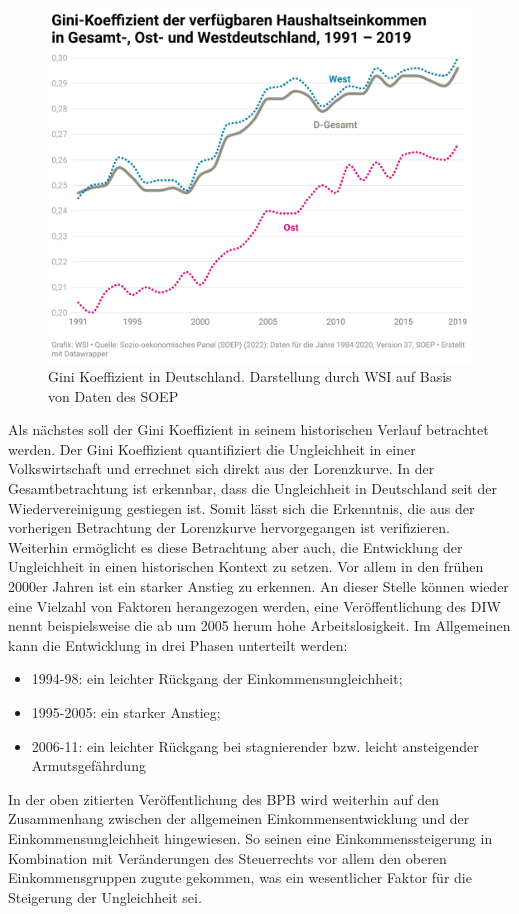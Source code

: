\documentclass[a4paper,12pt]{article}
\begin{document}
\begin{figure}[h]
\centering
\includegraphics*[width=1.0\textwidth]{gini}
\caption[short]{Gini Koeffizient in Deutschland. Darstellung durch WSI auf Basis von Daten des SOEP \cite{wsi_2024}}
\end{figure}

Als nächstes soll der Gini Koeffizient in seinem historischen Verlauf betrachtet werden. Der Gini Koeffizient quantifiziert die Ungleichheit in einer Volkswirtschaft und errechnet sich direkt aus der Lorenzkurve. In der Gesamtbetrachtung
ist erkennbar, dass die Ungleichheit in Deutschland seit der Wiedervereinigung gestiegen ist. Somit lässt sich die Erkenntnis, die aus der vorherigen Betrachtung der Lorenzkurve hervorgegangen ist verifizieren. Weiterhin ermöglicht es diese Betrachtung aber auch, 
die Entwicklung der Ungleichheit in einen historischen Kontext zu setzen. Vor allem in den frühen 2000er Jahren ist ein starker Anstieg zu erkennen. An dieser Stelle können wieder eine Vielzahl von Faktoren herangezogen werden, eine Veröffentlichung des DIW nennt beispielsweise
die ab um 2005 herum hohe Arbeitslosigkeit. \cite{grabka_goebel_2020}
Im Allgemeinen kann die Entwicklung in drei Phasen unterteilt werden:  \begin{itemize}
    \item 1994-98: ein leichter Rückgang der Einkommensungleichheit;
    \item 1995-2005: ein starker Anstieg;
    \item 2006-11: ein leichter Rückgang bei stagnierender bzw. leicht ansteigender Armutsgefährdung \cite{gebauer_martens_2020}
\end{itemize}
In der oben zitierten Veröffentlichung des BPB wird weiterhin auf den Zusammenhang zwischen der allgemeinen Einkommensentwicklung und der Einkommensungleichheit hingewiesen. So seinen eine Einkommenssteigerung in Kombination mit Veränderungen des Steuerrechts vor allem den oberen Einkommensgruppen zugute gekommen, was ein wesentlicher Faktor für die Steigerung der Ungleichheit sei. \cite{gebauer_martens_2020}
\end{document}
